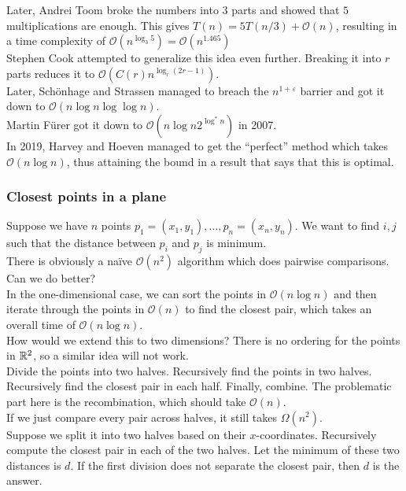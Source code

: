 Later, Andrei Toom broke the numbers into $3$ parts and showed that $5$ multiplications are enough. This gives $T(n)=5T(n/3)+\mathcal{O}(n)$, resulting in a time complexity of $\mathcal{O}(n^{\log_3 5}) = \mathcal{O}(n^1.465)$\\

Stephen Cook attempted to generalize this idea even further. Breaking it into $r$ parts reduces it to $\mathcal{O}(C(r)n^{\log_r(2r-1)})$.\\
Later, Sch\"onhage and Strassen managed to breach the $n^{1+\varepsilon}$ barrier and got it down to $\mathcal{O}(n \log n \log\log n)$.\\
Martin F\"urer got it down to $\mathcal{O}(n\log n 2^{\log^* n})$ in 2007.\\
In 2019, Harvey and Hoeven managed to get the ``perfect'' method which takes $\mathcal{O}(n\log n)$, thus attaining the bound in a result that says that this is optimal.\\

\subsubsection{Closest points in a plane}

Suppose we have $n$ points $p_1=(x_1,y_1),\ldots,p_n=(x_n,y_n)$. We want to find $i,j$ such that the distance between $p_i$ and $p_j$ is minimum.\\

There is obviously a na\"ive $\mathcal{O}(n^2)$ algorithm which does pairwise comparisons. Can we do better?\\

In the one-dimensional case, we can sort the points in $\mathcal{O}(n\log n)$ and then iterate through the points in $\mathcal{O}(n)$ to find the closest pair, which takes an overall time of $\mathcal{O}(n\log n)$.\\
How would we extend this to two dimensions? There is no ordering for the points in $\mathbb{R}^2$, so a similar idea will not work.\\

Divide the points into two halves. Recursively find the points in two halves. Recursively find the closest pair in each half. Finally, combine. The problematic part here is the recombination, which should take $\mathcal{O}(n)$.\\
If we just compare every pair across halves, it still takes $\Omega(n^2)$.\\

Suppose we split it into two halves based on their $x$-coordinates. Recursively compute the closest pair in each of the two halves. Let the minimum of these two distances is $d$. If the first division does not separate the closest pair, then $d$ is the answer.

